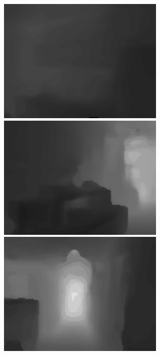 \begin{figure}[htb]
\begin{subfigure}{0.24\linewidth}
\begin{minipage}[b]{1\linewidth}
  \includegraphics[width=1\linewidth]{figure/Without_FAM/00001_colors.png}\vspace{4pt}
  \includegraphics[width=1\linewidth]{figure/Without_FAM/00008_colors.png}\vspace{4pt}
  \includegraphics[width=1\linewidth]{figure/Without_FAM/00014_colors.png}

\end{minipage}
\end{subfigure}
\end{figure}

